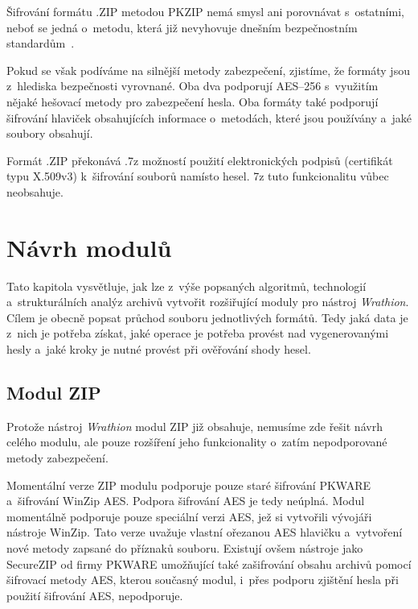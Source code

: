  Šifrování formátu .ZIP metodou PKZIP nemá smysl ani porovnávat s~ostatními, neboť se jedná
o~metodu, která již nevyhovuje dnešním bezpečnostním standardům~\cite{PKWARE:2014}. 

 Pokud se však podíváme na silnější metody zabezpečení, zjistíme, že formáty jsou z~hlediska
bezpečnosti vyrovnané. Oba dva podporují AES--256 s~využitím nějaké hešovací metody pro zabezpečení
hesla. Oba formáty také podporují šifrování hlaviček obsahujících informace o~metodách, které jsou
používány a~jaké soubory obsahují.

 Formát .ZIP překonává .7z možností použití elektronických podpisů (certifikát typu X.509v3)
k~šifrování souborů namísto hesel. 7z tuto funkcionalitu vůbec neobsahuje. 



\chapter{Návrh modulů}
\label{ch:moduly}
Tato kapitola vysvětluje, jak lze z~výše popsaných algoritmů, technologií a~strukturálních
analýz archivů vytvořit rozšiřující moduly pro nástroj {\it Wrathion}. Cílem je obecně popsat
průchod souboru jednotlivých formátů. Tedy jaká data je z~nich je potřeba získat, jaké operace je
potřeba provést nad vygenerovanými hesly a~jaké kroky je nutné provést při ověřování shody hesel.

\section{Modul ZIP}
Protože nástroj {\it Wrathion} modul ZIP již obsahuje, nemusíme zde řešit návrh celého modulu,
ale pouze rozšíření jeho funkcionality o~zatím nepodporované metody zabezpečení.

 Momentální verze ZIP modulu podporuje pouze staré šifrování PKWARE a~šifrování WinZip AES.
 Podpora šifrování AES je tedy neúplná. Modul momentálně podporuje pouze speciální verzi AES, jež
 si vytvořili vývojáři nástroje WinZip. Tato verze uvažuje vlastní ořezanou AES hlavičku
 a~vytvoření nové metody zapsané do příznaků souboru. Existují ovšem nástroje jako SecureZIP od
 firmy PKWARE umožňující také zašifrování obsahu archivů pomocí šifrovací metody AES, kterou
 současný modul, i~přes podporu zjištění hesla při použití šifrování AES, nepodporuje.


